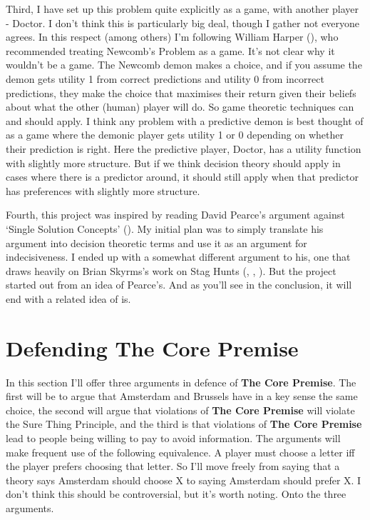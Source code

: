 \documentclass[
  11pt,
  letterpaper,
  DIV=11,
  numbers=noendperiod,
  twoside]{scrartcl}
\begin{document}
Third, I have set up this problem quite explicitly as a game, with
another player - Doctor. I don't think this is particularly big deal,
though I gather not everyone agrees. In this respect (among others) I'm
following William Harper (), who
recommended treating Newcomb's Problem as a game. It's not clear why it
wouldn't be a game. The Newcomb demon makes a choice, and if you assume
the demon gets utility 1 from correct predictions and utility 0 from
incorrect predictions, they make the choice that maximises their return
given their beliefs about what the other (human) player will do. So game
theoretic techniques can and should apply. I think any problem with a
predictive demon is best thought of as a game where the demonic player
gets utility 1 or 0 depending on whether their prediction is right. Here
the predictive player, Doctor, has a utility function with slightly more
structure. But if we think decision theory should apply in cases where
there is a predictor around, it should still apply when that predictor
has preferences with slightly more structure.

Fourth, this project was inspired by reading David Pearce's argument
against `Single Solution Concepts' (). My initial plan was to simply translate his argument into
decision theoretic terms and use it as an argument for indecisiveness. I
ended up with a somewhat different argument to his, one that draws
heavily on Brian Skyrms's work on Stag Hunts
(, ,
). But the project started out from an
idea of Pearce's. And as you'll see in the conclusion, it will end with
a related idea of is.

\section{Defending The Core Premise}\label{defending-the-core-premise}

In this section I'll offer three arguments in defence of \textbf{The
Core Premise}. The first will be to argue that Amsterdam and Brussels
have in a key sense the same choice, the second will argue that
violations of \textbf{The Core Premise} will violate the Sure Thing
Principle, and the third is that violations of \textbf{The Core Premise}
lead to people being willing to pay to avoid information. The arguments
will make frequent use of the following equivalence. A player must
choose a letter iff the player prefers choosing that letter. So I'll
move freely from saying that a theory says Amsterdam should choose X to
saying Amsterdam should prefer X. I don't think this should be
controversial, but it's worth noting. Onto the three arguments.
\end{document}
